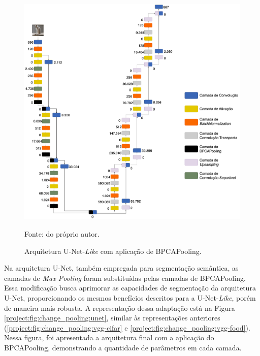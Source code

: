 \begin{figure}[H]
    \centering
    \caption{Arquitetura U-Net-\textit{Like} com aplicação de BPCAPooling.}
    \includegraphics[width=1\textwidth]{recursos/imagens/project/unet-like-with-bpca-food.png}
    \label{project:fig:change_pooling:unet-like}

    Fonte: do próprio autor.
\end{figure}

Na arquitetura U-Net, também empregada para segmentação semântica, as camadas de \textit{Max Pooling} foram substituídas pelas camadas de BPCAPooling. Essa modificação busca aprimorar as capacidades de segmentação da arquitetura U-Net, proporcionando os mesmos benefícios descritos para a U-Net-\textit{Like}, porém de maneira mais robusta. A representação dessa adaptação está na Figura \ref{project:fig:change_pooling:unet}, similar às representações anteriores (\ref{project:fig:change_pooling:vgg-cifar} e \ref{project:fig:change_pooling:vgg-food}). Nessa figura, foi apresentada a arquitetura final com a aplicação do BPCAPooling, demonstrando a quantidade de parâmetros em cada camada.

